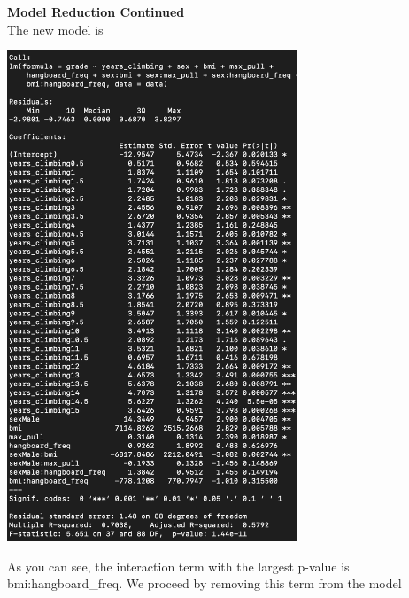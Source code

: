 \documentclass[11pt]{amsart}
\begin{document}
\newpage
{\bf Model Reduction Continued}\\
The new model is\\
\begin{center}
\includegraphics[width=0.65\textwidth]{mod3}
\end{center}
\vspace{0.15in}
As you can see, the interaction term with the largest p-value is bmi:hangboard\_freq.
We proceed by removing this term from the model
\end{document}

